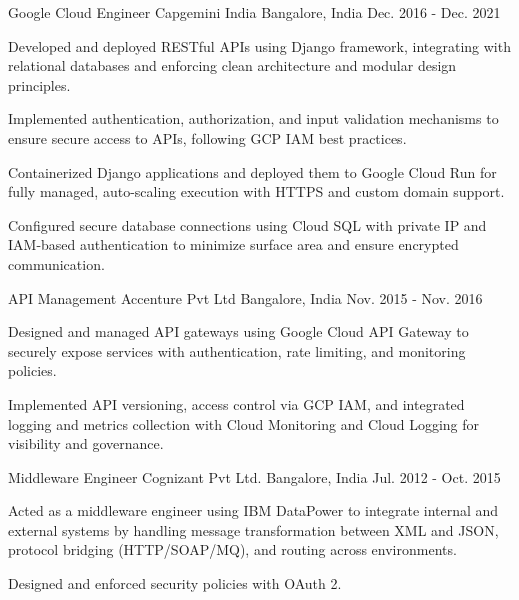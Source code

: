 \begin{cventries}
  \cventry
    {Google Cloud Engineer} %
    {Capgemini India} %
    {Bangalore, India} %
    {Dec. 2016 - Dec. 2021} %
    {
      \begin{cvitems} %
        \item {Developed and deployed RESTful APIs using Django framework, integrating with relational databases and enforcing clean architecture and modular design principles.}
        \item {Implemented authentication, authorization, and input validation mechanisms to ensure secure access to APIs, following GCP IAM best practices.}
        \item {Containerized Django applications and deployed them to Google Cloud Run for fully managed, auto-scaling execution with HTTPS and custom domain support.}
        \item {Configured secure database connections using Cloud SQL with private IP and IAM-based authentication to minimize surface area and ensure encrypted communication.}
      \end{cvitems}
    }

  \cventry
    {API Management} %
    {Accenture Pvt Ltd} %
    {Bangalore, India} %
    {Nov. 2015 - Nov. 2016} %
    {
      \begin{cvitems} %
        \item {Designed and managed API gateways using Google Cloud API Gateway to securely expose services with authentication, rate limiting, and monitoring policies.}
        \item {Implemented API versioning, access control via GCP IAM, and integrated logging and metrics collection with Cloud Monitoring and Cloud Logging for visibility and governance.}
      \end{cvitems}
    }

  \cventry
    {Middleware Engineer} %
    {Cognizant Pvt Ltd.} %
    {Bangalore, India} %
    {Jul. 2012 - Oct. 2015} %
    {
      \begin{cvitems} %
        \item {Acted as a middleware engineer using IBM DataPower to integrate internal and external systems by handling message transformation between XML and JSON, protocol bridging (HTTP/SOAP/MQ), and routing across environments.}
        \item {Designed and enforced security policies with OAuth 2.}
      \end{cvitems}
    }


\end{cventries}
